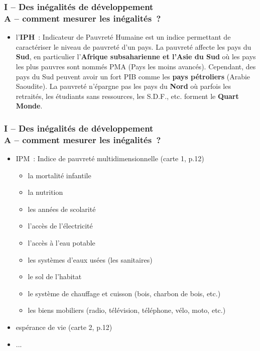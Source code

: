 \documentclass[C]{beamer}
\begin{document}
	
	\begin{frame}
	\frametitle{I -- Des inégalités de développement\\ A -- comment mesurer les inégalités~?}
	\begin{itemize}
	\item l'\textbf{IPH}~: Indicateur de Pauvreté Humaine est un indice permettant de caractériser le niveau de pauvreté d'un pays. La pauvreté affecte les pays du \textbf{Sud}, en particulier l'\textbf{Afrique subsaharienne et l'Asie du Sud} où les pays les plus pauvres sont nommés PMA (Pays les moins avancés). Cependant, des pays du Sud peuvent avoir un fort PIB comme les \textbf{pays pétroliers} (Arabie Saoudite). La pauvreté n'épargne pas les pays du \textbf{Nord} où parfois les retraités, les étudiants sans ressources, les S.D.F., etc. forment le \textbf{Quart Monde}.
	\end{itemize}
	\end{frame}
	
	\begin{frame}
	\frametitle{I -- Des inégalités de développement\\ A -- comment mesurer les inégalités~?}
	\begin{itemize}
	\item IPM~: Indice de pauvreté multidimensionnelle (carte 1, p.12)
		\begin{itemize}
		\item la mortalité infantile
		\item la nutrition
		\item les années de scolarité
		\item l'accès de l'électricité
		\item l'accès à l'eau potable
		\item les systèmes d'eaux usées (les sanitaires)
		\item le sol de l'habitat
		\item le système de chauffage et cuisson (bois, charbon de bois, etc.)
		\item les biens mobiliers (radio, télévision, téléphone, vélo, moto, etc.)
		\end{itemize}
	\item espérance de vie (carte 2, p.12)
	\item ...
	\end{itemize}
	\end{frame}
	
\end{document}
